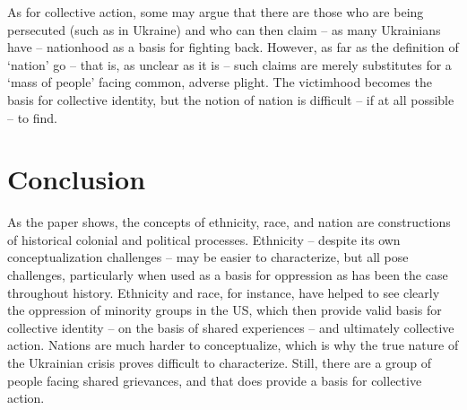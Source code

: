 \documentclass[11pt]{article}
\begin{document}
As for collective action, some may argue that there are those who are being persecuted (such as in Ukraine) and who can then claim – as many Ukrainians have – nationhood as a basis for fighting back. However, as far as the definition of ‘nation’ go – that is, as unclear as it is – such claims are merely substitutes for a ‘mass of people’ facing common, adverse plight. The victimhood becomes the basis for collective identity, but the notion of nation is difficult – if at all possible – to find.

\section{Conclusion}

As the paper shows, the concepts of ethnicity, race, and nation are constructions of historical colonial and political processes. Ethnicity – despite its own conceptualization challenges – may be easier to characterize, but all pose challenges, particularly when used as a basis for oppression as has been the case throughout history. Ethnicity and race, for instance, have helped to see clearly the oppression of minority groups in the US, which then provide valid basis for collective identity – on the basis of shared experiences – and ultimately collective action. Nations are much harder to conceptualize, which is why the true nature of the Ukrainian crisis proves difficult to characterize. Still, there are a group of people facing shared grievances, and that does provide a basis for collective action.
\end{document}

